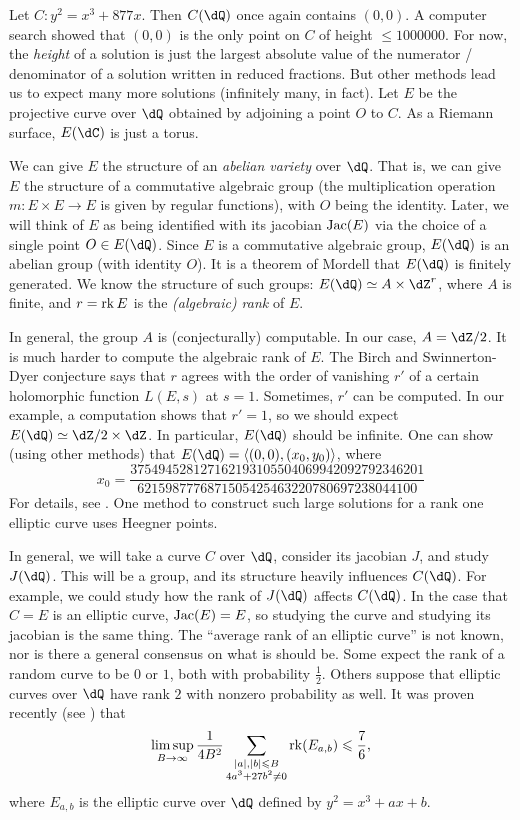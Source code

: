 \documentclass{article}
\begin{document}
\begin{example}
Let $C:y^2=x^3+877 x$. Then $C(\dQ)$ once again contains $(0,0)$. A 
computer search showed that $(0,0)$ is the only point on $C$ of height 
$\leqslant 1000000$. For now, the \emph{height} of a solution is just the 
largest absolute value of the numerator / denominator of a solution written 
in reduced fractions. But other methods lead us to expect many more solutions
(infinitely many, in fact). Let $E$ be the projective curve over $\dQ$ obtained 
by adjoining a point $O$ to $C$. As a Riemann surface, $E(\dC)$ is just a 
torus. 

We can give $E$ the 
structure of an \emph{abelian variety} over $\dQ$. That is, we can give $E$ the 
structure of a commutative algebraic group (the multiplication operation 
$m:E\times E\to E$ is given by regular functions), 
with $O$ being the identity. Later, we will think of $E$ as 
being identified with its jacobian $\operatorname{Jac}(E)$ via the choice of a single point 
$O\in E(\dQ)$. Since $E$ is a commutative algebraic group, $E(\dQ)$ is an 
abelian group (with identity $O$). It is a theorem of Mordell that $E(\dQ)$ is 
finitely generated. We know the structure of such groups: 
$E(\dQ)\simeq A\times \dZ^r$, where $A$ is finite, and $r=\operatorname{rk} E$ 
is the \emph{(algebraic) rank} of $E$. 

In general, the group $A$ is (conjecturally) computable. 
In our case, $A=\dZ/2$. It is much harder to 
compute the algebraic rank of $E$. The Birch and Swinnerton-Dyer 
conjecture says that $r$ agrees with the order of vanishing $r'$ of a certain 
holomorphic function $L(E,s)$ at $s=1$. Sometimes, $r'$ can be computed.  
In our example, a computation shows that $r'=1$, so we should expect 
$E(\dQ)\simeq \dZ/2\times\dZ$. In particular, 
$E(\dQ)$ should be infinite. One can show (using other methods) that 
$E(\dQ)=\langle (0,0),(x_0,y_0)\rangle$, where 
\[
  x_0 = \frac{37 5494 5281 2716 2193 1055 0406 9942 0927 9234 6201}{6215 9877 7687 1505 4254 6322 0780 6972 3804 4100}
\]
For details, see \cite{br84}. One method to construct such large solutions for 
a rank one elliptic curve uses Heegner points. 
\end{example}

In general, we will take a curve $C$ over $\dQ$, consider its jacobian $J$, and study 
$J(\dQ)$. This will be a group, and its structure heavily influences $C(\dQ)$. 
For example, we could study how the rank of $J(\dQ)$ affects $C(\dQ)$. In the 
case that $C=E$ is an elliptic curve, $\operatorname{Jac}(E)=E$, so studying the curve and 
studying its jacobian is the same thing. The ``average rank of an elliptic 
curve'' is not known, nor is there a general consensus on what is should be. 
Some expect the rank of a random curve to be $0$ or $1$, both with 
probability $\frac 1 2$. Others suppose that elliptic curves over $\dQ$ have 
rank $2$ with nonzero probability as well. It was proven recently (see 
\cite[\S 1]{bh10}) that 
\[
  \limsup_{B\to\infty} \frac{1}{4 B^2} \sum_{\substack{|a|,|b|\leqslant B \\ 4 a^3+27 b^2\ne 0}} \operatorname{rk}(E_{a,b}) \leqslant\frac 7 6 \text{,}
\]
where $E_{a,b}$ is the elliptic curve over $\dQ$ defined by $y^2=x^3 +a x+b$.
\end{document}
